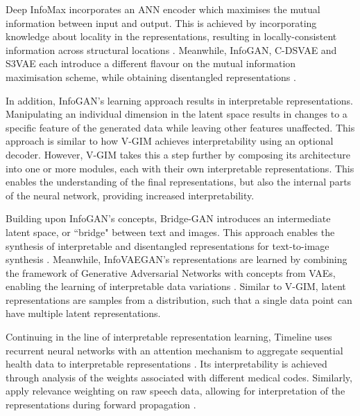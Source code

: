 	Deep InfoMax incorporates an ANN encoder which maximises the mutual information between input and output. This is achieved by incorporating knowledge about locality in the representations, resulting in locally-consistent information across structural locations \citep{hjelmLearningDeepRepresentations2019}. Meanwhile, InfoGAN, C-DSVAE and S3VAE each introduce a different flavour on the mutual information maximisation scheme, while obtaining disentangled representations \citep{chenInfoGANInterpretableRepresentation2016, baiContrastivelyDisentangledSequential2021, zhuS3VAESelfSupervisedSequential2020}. 
	
	In addition, InfoGAN's learning approach results in interpretable representations. Manipulating an individual dimension in the latent space results in changes to a specific feature of the generated data while leaving other features unaffected. This approach is similar to how V-GIM achieves interpretability using an optional decoder. However, V-GIM takes this a step further by composing its architecture into one or more modules, each with their own interpretable representations. This enables the understanding of the final representations, but also the internal parts of the neural network, providing increased interpretability.
	
	Building upon InfoGAN's concepts, Bridge-GAN introduces an intermediate latent space, or ``bridge" between text and images. This approach enables the synthesis of interpretable and disentangled representations for text-to-image synthesis \citep{yuanBridgeGANInterpretableRepresentation2020}. Meanwhile, InfoVAEGAN's representations are learned by combining the framework of Generative Adversarial Networks with concepts from VAEs, enabling the learning of interpretable data variations \citep{yeInfoVAEGANLearningJoint2021}. Similar to V-GIM, latent representations are samples from a distribution, such that a single data point can have multiple latent representations.
	
	Continuing in the line of interpretable representation learning, Timeline uses recurrent neural networks with an attention mechanism to aggregate sequential health data to interpretable representations \citep{baiInterpretableRepresentationLearning2018}. Its interpretability is achieved through analysis of the weights associated with different medical codes. Similarly, \cite{agrawalInterpretableRepresentationLearning2020} apply relevance weighting on raw speech data, allowing for interpretation of the representations during forward propagation . 
	
